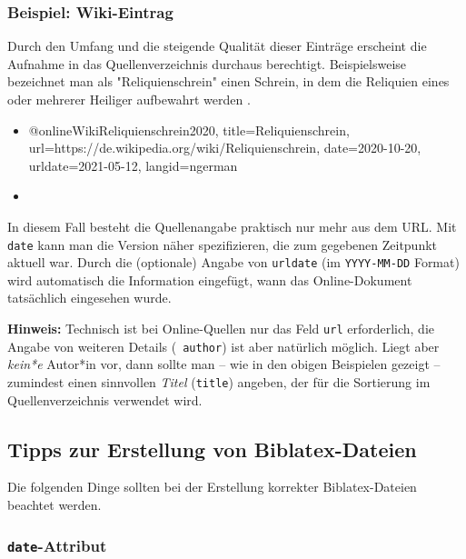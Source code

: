 \subsubsection{Beispiel: Wiki-Eintrag}
\label{sec:@online-www}

Durch den Umfang und die steigende Qualität dieser Einträge erscheint die Aufnahme in das Quellenverzeichnis durchaus
berechtigt. Beispielsweise bezeichnet man als "Reliquienschrein" einen Schrein, in dem die Reliquien eines oder
mehrerer Heiliger aufbewahrt werden \cite{WikiReliquienschrein2020}.
%
\begin{itemize}
\item[]
\begin{GenericCode}[numbers=none]
@online{WikiReliquienschrein2020,
  title={Reliquienschrein},
  url={https://de.wikipedia.org/wiki/Reliquienschrein},
  date={2020-10-20},
  urldate={2021-05-12},
  langid={ngerman}
}
\end{GenericCode}
\item[\cite{WikiReliquienschrein2020}] 
\end{itemize}
%
In diesem Fall besteht die Quellenangabe praktisch nur mehr aus dem URL. Mit \texttt{date} kann man die Version näher
spezifizieren, die zum gegebenen Zeitpunkt aktuell war. Durch die (optionale) Angabe von \texttt{urldate} (im
\texttt{YYYY-MM-DD} Format) wird automatisch die Information eingefügt, wann das Online-Dokument tatsächlich
eingesehen wurde.

\noindent\textbf{Hinweis:} Technisch ist bei Online-Quellen nur das Feld \texttt{url} erforderlich, die Angabe von
weiteren Details (\zB\ \texttt{author}) ist aber natürlich möglich. Liegt aber \emph{kein*e} Autor*in vor, dann
sollte man -- wie in den obigen Beispielen gezeigt -- zumindest einen sinnvollen \emph{Titel} (\texttt{title})
angeben, der für die Sortierung im Quellenverzeichnis verwendet wird.


\subsection{Tipps zur Erstellung von Biblatex-Dateien}
\label{sec:TippsZuBiblatex}

Die folgenden Dinge sollten bei der Erstellung korrekter Biblatex-Dateien beachtet werden.

\subsubsection{\texttt{date}-Attribut}

